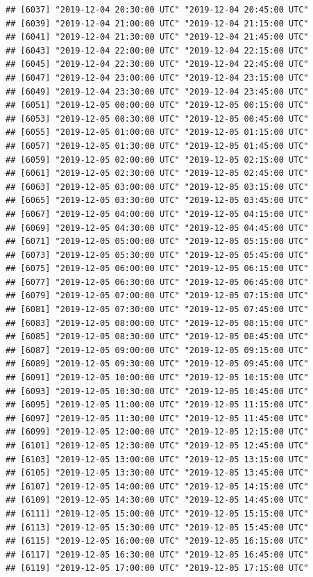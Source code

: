 \documentclass{article}\usepackage[]{graphicx}\usepackage[]{color}
\makeatletter
\newenvironment{kframe}{%
 \def\at@end@of@kframe{}%
 \ifinner\ifhmode%
  \def\at@end@of@kframe{\end{minipage}}%
  \begin{minipage}{\columnwidth}%
 \fi\fi%
 \def\FrameCommand##1{\hskip\@totalleftmargin \hskip-\fboxsep
 \colorbox{shadecolor}{##1}\hskip-\fboxsep
     \hskip-\linewidth \hskip-\@totalleftmargin \hskip\columnwidth}%
 \MakeFramed {\advance\hsize-\width
   \@totalleftmargin\z@ \linewidth\hsize
   \@setminipage}}%
 {\par\unskip\endMakeFramed%
 \at@end@of@kframe}
\newenvironment{knitrout}{}{} %
\makeatother
\begin{document}
\begin{knitrout}
\begin{kframe}
\begin{verbatim}
## [6037] "2019-12-04 20:30:00 UTC" "2019-12-04 20:45:00 UTC"
## [6039] "2019-12-04 21:00:00 UTC" "2019-12-04 21:15:00 UTC"
## [6041] "2019-12-04 21:30:00 UTC" "2019-12-04 21:45:00 UTC"
## [6043] "2019-12-04 22:00:00 UTC" "2019-12-04 22:15:00 UTC"
## [6045] "2019-12-04 22:30:00 UTC" "2019-12-04 22:45:00 UTC"
## [6047] "2019-12-04 23:00:00 UTC" "2019-12-04 23:15:00 UTC"
## [6049] "2019-12-04 23:30:00 UTC" "2019-12-04 23:45:00 UTC"
## [6051] "2019-12-05 00:00:00 UTC" "2019-12-05 00:15:00 UTC"
## [6053] "2019-12-05 00:30:00 UTC" "2019-12-05 00:45:00 UTC"
## [6055] "2019-12-05 01:00:00 UTC" "2019-12-05 01:15:00 UTC"
## [6057] "2019-12-05 01:30:00 UTC" "2019-12-05 01:45:00 UTC"
## [6059] "2019-12-05 02:00:00 UTC" "2019-12-05 02:15:00 UTC"
## [6061] "2019-12-05 02:30:00 UTC" "2019-12-05 02:45:00 UTC"
## [6063] "2019-12-05 03:00:00 UTC" "2019-12-05 03:15:00 UTC"
## [6065] "2019-12-05 03:30:00 UTC" "2019-12-05 03:45:00 UTC"
## [6067] "2019-12-05 04:00:00 UTC" "2019-12-05 04:15:00 UTC"
## [6069] "2019-12-05 04:30:00 UTC" "2019-12-05 04:45:00 UTC"
## [6071] "2019-12-05 05:00:00 UTC" "2019-12-05 05:15:00 UTC"
## [6073] "2019-12-05 05:30:00 UTC" "2019-12-05 05:45:00 UTC"
## [6075] "2019-12-05 06:00:00 UTC" "2019-12-05 06:15:00 UTC"
## [6077] "2019-12-05 06:30:00 UTC" "2019-12-05 06:45:00 UTC"
## [6079] "2019-12-05 07:00:00 UTC" "2019-12-05 07:15:00 UTC"
## [6081] "2019-12-05 07:30:00 UTC" "2019-12-05 07:45:00 UTC"
## [6083] "2019-12-05 08:00:00 UTC" "2019-12-05 08:15:00 UTC"
## [6085] "2019-12-05 08:30:00 UTC" "2019-12-05 08:45:00 UTC"
## [6087] "2019-12-05 09:00:00 UTC" "2019-12-05 09:15:00 UTC"
## [6089] "2019-12-05 09:30:00 UTC" "2019-12-05 09:45:00 UTC"
## [6091] "2019-12-05 10:00:00 UTC" "2019-12-05 10:15:00 UTC"
## [6093] "2019-12-05 10:30:00 UTC" "2019-12-05 10:45:00 UTC"
## [6095] "2019-12-05 11:00:00 UTC" "2019-12-05 11:15:00 UTC"
## [6097] "2019-12-05 11:30:00 UTC" "2019-12-05 11:45:00 UTC"
## [6099] "2019-12-05 12:00:00 UTC" "2019-12-05 12:15:00 UTC"
## [6101] "2019-12-05 12:30:00 UTC" "2019-12-05 12:45:00 UTC"
## [6103] "2019-12-05 13:00:00 UTC" "2019-12-05 13:15:00 UTC"
## [6105] "2019-12-05 13:30:00 UTC" "2019-12-05 13:45:00 UTC"
## [6107] "2019-12-05 14:00:00 UTC" "2019-12-05 14:15:00 UTC"
## [6109] "2019-12-05 14:30:00 UTC" "2019-12-05 14:45:00 UTC"
## [6111] "2019-12-05 15:00:00 UTC" "2019-12-05 15:15:00 UTC"
## [6113] "2019-12-05 15:30:00 UTC" "2019-12-05 15:45:00 UTC"
## [6115] "2019-12-05 16:00:00 UTC" "2019-12-05 16:15:00 UTC"
## [6117] "2019-12-05 16:30:00 UTC" "2019-12-05 16:45:00 UTC"
## [6119] "2019-12-05 17:00:00 UTC" "2019-12-05 17:15:00 UTC"

\end{verbatim}
\end{kframe}
\end{knitrout}
\end{document}
